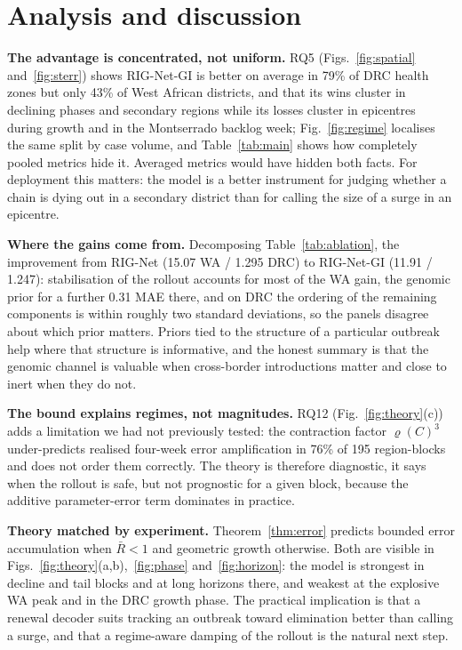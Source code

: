 \documentclass[conference]{IEEEtran}
\begin{document}
\section{Analysis and discussion}\label{sec:analysis}

\textbf{The advantage is concentrated, not uniform.} RQ5 (Figs.~\ref{fig:spatial} and~\ref{fig:sterr}) shows RIG-Net-GI is better on average in 79\% of DRC health zones but only 43\% of West African districts, and that its wins cluster in declining phases and secondary regions while its losses cluster in epicentres during growth and in the Montserrado backlog week; Fig.~\ref{fig:regime} localises the same split by case volume, and Table~\ref{tab:main} shows how completely pooled metrics hide it. Averaged metrics would have hidden both facts. For deployment this matters: the model is a better instrument for judging whether a chain is dying out in a secondary district than for calling the size of a surge in an epicentre.

\textbf{Where the gains come from.} Decomposing Table~\ref{tab:ablation}, the improvement from RIG-Net (15.07 WA / 1.295 DRC) to RIG-Net-GI (11.91 / 1.247): stabilisation of the rollout accounts for most of the WA gain, the genomic prior for a further 0.31 MAE there, and on DRC the ordering of the remaining components is within roughly two standard deviations, so the panels disagree about which prior matters. Priors tied to the structure of a particular outbreak help where that structure is informative, and the honest summary is that the genomic channel is valuable when cross-border introductions matter and close to inert when they do not.

\textbf{The bound explains regimes, not magnitudes.} RQ12 (Fig.~\ref{fig:theory}(c)) adds a limitation we had not previously tested: the contraction factor $\varrho(C)^3$ under-predicts realised four-week error amplification in 76\% of 195 region-blocks and does not order them correctly. The theory is therefore diagnostic, it says when the rollout is safe, but not prognostic for a given block, because the additive parameter-error term dominates in practice.

\textbf{Theory matched by experiment.} Theorem~\ref{thm:error} predicts bounded error accumulation when $\bar R<1$ and geometric growth otherwise. Both are visible in Figs.~\ref{fig:theory}(a,b),~\ref{fig:phase} and~\ref{fig:horizon}: the model is strongest in decline and tail blocks and at long horizons there, and weakest at the explosive WA peak and in the DRC growth phase. The practical implication is that a renewal decoder suits tracking an outbreak toward elimination better than calling a surge, and that a regime-aware damping of the rollout is the natural next step.
\end{document}
